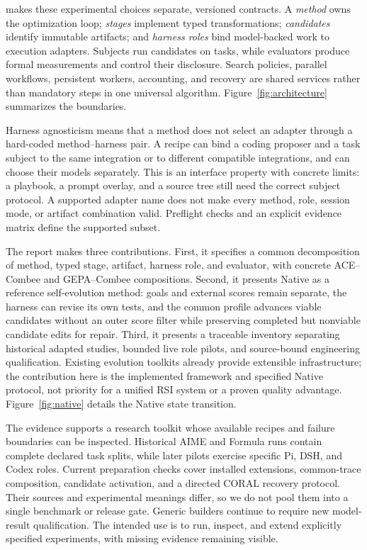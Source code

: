 \proteus{} makes these experimental choices separate, versioned contracts. A \emph{method} owns the optimization loop; \emph{stages} implement typed transformations; \emph{candidates} identify immutable artifacts; and \emph{harness roles} bind model-backed work to execution adapters. Subjects run candidates on tasks, while evaluators produce formal measurements and control their disclosure. Search policies, parallel workflows, persistent workers, accounting, and recovery are shared services rather than mandatory steps in one universal algorithm. Figure~\ref{fig:architecture} summarizes the boundaries.

Harness agnosticism means that a method does not select an adapter through a hard-coded method--harness pair. A recipe can bind a coding proposer and a task subject to the same integration or to different compatible integrations, and can choose their models separately. This is an interface property with concrete limits: a playbook, a prompt overlay, and a source tree still need the correct subject protocol. A supported adapter name does not make every method, role, session mode, or artifact combination valid. Preflight checks and an explicit evidence matrix define the supported subset.

The report makes three contributions. First, it specifies a common decomposition of method, typed stage, artifact, harness role, and evaluator, with concrete ACE--Combee and GEPA--Combee compositions. Second, it presents Native as a reference self-evolution method: goals and external scores remain separate, the harness can revise its own tests, and the common profile advances viable candidates without an outer score filter while preserving completed but nonviable candidate edits for repair. Third, it presents a traceable inventory separating historical adapted studies, bounded live role pilots, and source-bound engineering qualification. Existing evolution toolkits already provide extensible infrastructure; the contribution here is the implemented framework and specified Native protocol, not priority for a unified RSI system or a proven quality advantage. Figure~\ref{fig:native} details the Native state transition.

The evidence supports a research toolkit whose available recipes and failure boundaries can be inspected. Historical AIME and Formula runs contain complete declared task splits, while later pilots exercise specific Pi, DSH, and Codex roles. Current preparation checks cover installed extensions, common-trace composition, candidate activation, and a directed CORAL recovery protocol. Their sources and experimental meanings differ, so we do not pool them into a single benchmark or release gate. Generic builders continue to require new model-result qualification. The intended use is to run, inspect, and extend explicitly specified experiments, with missing evidence remaining visible.
